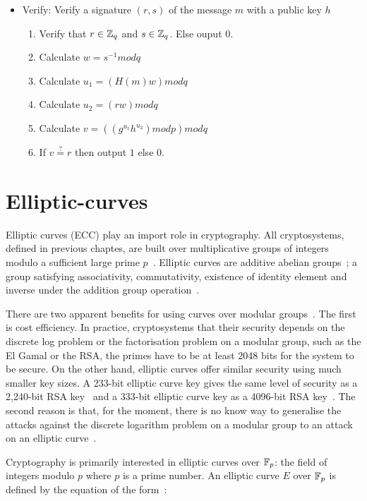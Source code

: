 \begin{itemize}
  \item Verify: Verify a signature $(r, s)$ of the message $m$ with a public key $h$
    \begin{enumerate}
      \item Verify that $r \in \mathbb{Z}_q$ and $s \in \mathbb{Z}_q$. Else ouput $0$.
      \item Calculate $w = s^{-1}modq$
      \item Calculate $u_1 = (H(m)w)modq$
      \item Calculate $u_2 = (rw)modq$
      \item Calculate $v = ((g^{u_1}h^{u_2})modp)modq$
      \item If $v \stackrel{?}{=} r$ then output $1$ else $0$.
    \end{enumerate}
\end{itemize}

\section{Elliptic-curves}
\label{preliminaries:el_curves}

Elliptic curves (ECC) play an import role in cryptography. All cryptosystems, defined in previous chaptes, are built over multiplicative groups of integers modulo a sufficient large prime $p$~\cite{kiagias:crypto, boneh_crypto}. Elliptic curves are additive abelian groups~\cite{kiagias:crypto}; a group satisfying associativity, commutativity, existence of identity element and inverse under the addition group operation~\cite{elliptic_curves_2}.

There are two apparent benefits for using curves over modular groups~\cite{kiagias:crypto}. The first is cost efficiency. In practice, cryptosystems that their security depends on the discrete log problem or the factorisation problem on a modular group, such as the El Gamal or the RSA, the primes have to be at least 2048 bits for the system to be secure. On the other hand, elliptic curves offer similar security using much smaller key sizes. A 233-bit elliptic curve key gives the same level of security as a 2,240-bit RSA key~\cite{ecc_rsa_bits, ecc_rsa_bits_1} and a 333-bit elliptic curve key as a 4096-bit RSA key~\cite{blake1999elliptic}. The second reason is that, for the moment, there is no know way to generalise the attacks against the discrete logarithm problem on a modular group to an attack on an elliptic curve~\cite{kiagias:crypto}.

Cryptography is primarily interested in elliptic curves over $\mathbb{F}_p$: the field of integers modulo $p$ where $p$ is a prime number. An elliptic curve $E$ over $\mathbb{F}_p$ is defined by the equation of the form~\cite{elliptic_curves, elliptic_curves_2}:

